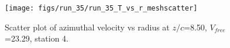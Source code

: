 \begin{figure}[H]
\centering
\texttt{[image: figs/run\_35/run\_35\_T\_vs\_r\_meshscatter]}
\caption{Scatter plot of azimuthal velocity vs radius at $z/c$=8.50, $V_{free}$=23.29, station 4.}
\label{fig:run_35_T_vs_r_meshscatter}
\end{figure}


